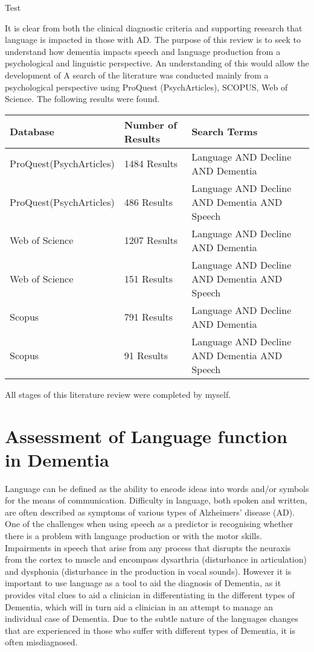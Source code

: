 \documentclass[a4paper]{article}
\begin{document}
\par
Test\newline
\par
It is clear from both the clinical diagnostic criteria and supporting research that language is impacted in those with AD. The purpose of this review is to seek to understand how dementia impacts speech and language production from a psychological and linguistic perspective. An understanding of this would allow the development of  A search of the literature was conducted mainly from a psychological perspective using ProQuest (PsychArticles), SCOPUS, Web of Science. The following results were found.

\begin{center}
	\begin{tabular}{ | l | l | l | p{3cm} |}
		\hline
		Database & Number of Results & Search Terms  \\ \hline
		ProQuest(PsychArticles) & 1484 Results & Language AND Decline AND Dementia \\ \hline
		ProQuest(PsychArticles) & 486 Results  & Language AND Decline AND Dementia AND Speech \\ \hline
		Web of Science & 1207 Results  & Language AND Decline AND Dementia   \\ \hline
		Web of Science & 151 Results  & Language AND Decline AND Dementia AND Speech  \\ \hline
		Scopus & 791 Results & Language AND Decline AND Dementia  \\ \hline
		Scopus & 91 Results & Language AND Decline AND Dementia AND Speech   \\ 
		\hline
	\end{tabular}
\end{center}

All stages of this literature review were completed by myself. 

\section{Assessment of Language function in Dementia}

Language can be defined as the ability to encode ideas into words and/or symbols for the means of communication. Difficulty in language, both spoken and written, are often described as symptoms of various types of Alzheimers' disease (AD). One of the challenges when using speech as a predictor is recognising whether there is a problem with language production or with the motor skills. Impairments in speech that arise from any process that disrupts the neuraxis from the cortex to muscle and encompass dysarthria (disturbance in articulation) and dysphonia (disturbance in the production in vocal sounds). However it is important to use language as a tool to aid the diagnosis of Dementia, as it provides vital clues to aid a clinician in differentiating in the different types of Dementia, which will in turn aid a clinician in an attempt to manage an individual case of Dementia. Due to the subtle nature of the languages changes that are experienced in those who suffer with different types of Dementia, it is often misdiagnosed.
\end{document}
